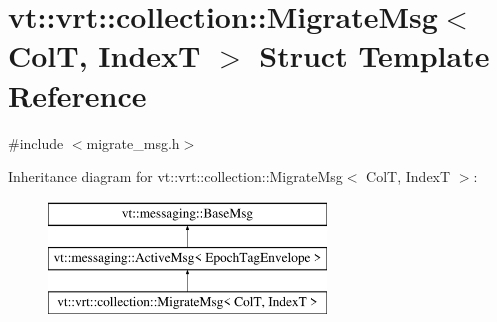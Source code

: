 \hypertarget{structvt_1_1vrt_1_1collection_1_1_migrate_msg}{}\section{vt\+:\+:vrt\+:\+:collection\+:\+:Migrate\+Msg$<$ ColT, IndexT $>$ Struct Template Reference}
\label{structvt_1_1vrt_1_1collection_1_1_migrate_msg}


{\ttfamily \#include $<$migrate\+\_\+msg.\+h$>$}

Inheritance diagram for vt\+:\+:vrt\+:\+:collection\+:\+:Migrate\+Msg$<$ ColT, IndexT $>$\+:\begin{figure}[H]
\begin{center}
\leavevmode
\includegraphics[height=3.000000cm]{structvt_1_1vrt_1_1collection_1_1_migrate_msg}
\end{center}
\end{figure}
